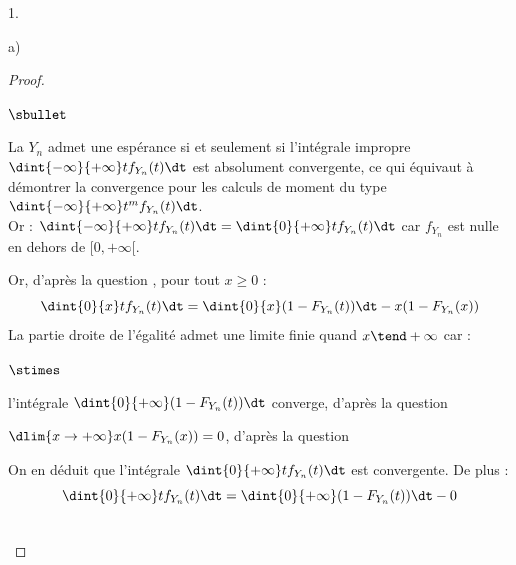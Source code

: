 \documentclass[11pt]{article}%
\begin{document}
\begin{noliste}{1.}
\begin{noliste}{a)}
    \begin{proof}~
      \begin{noliste}{$\sbullet$}
      \item La \var $Y_n$ admet une espérance si et seulement si
        l'intégrale impropre $\dint{-\infty}{+\infty} tf_{Y_n}(t)\dt$
        est absolument convergente, ce qui équivaut à démontrer la
        convergence pour les calculs de moment du type
        $\dint{-\infty}{+\infty} t^m f_{Y_n}(t)\dt$.\\
        Or : $\dint{-\infty}{+\infty} tf_{Y_n}(t)\dt =
        \dint{0}{+\infty} tf_{Y_n}(t)\dt$ car $f_{Y_n}$ est nulle en
        dehors de $[0, +\infty[$.
      \item Or, d'après la question , pour tout $x\geq 0$ :
      \[
      \dint{0}{x} tf_{Y_n}(t)\dt = \dint{0}{x}(1-F_{Y_n}(t)) \dt -
      x(1-F_{Y_n}(x)) %
      \]
      La partie droite de l'égalité admet une limite finie quand $x
      \tend +\infty$ car :
      \begin{noliste}{$\stimes$}
      \item l'intégrale $\dint{0}{+\infty} (1-F_{Y_n}(t))\dt$ 
	converge, d'après la question 
      \item $\dlim{x\to+\infty} x(1-F_{Y_n}(x))=0$, d'après la 
	question 
      \end{noliste}
      On en déduit que l'intégrale $\dint{0}{+\infty} tf_{Y_n}(t)\dt$ est
      convergente. De plus :
      \[
      \dint{0}{+\infty} tf_{Y_n}(t)\dt =
      \dint{0}{+\infty}(1-F_{Y_n}(t)) \dt - 0
      \]
      \end{noliste}
      ~\\[-1cm]
    \end{proof}
  \end{noliste}




\end{noliste}
\end{document}
